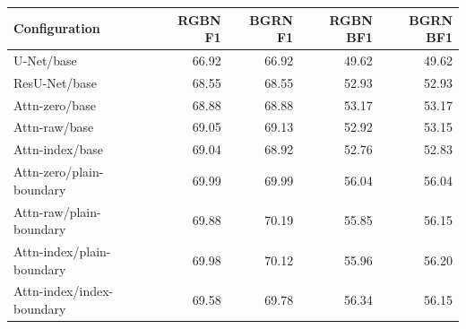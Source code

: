 \footnotesize
\setlength{\tabcolsep}{3.5pt}
\begin{tabular}{@{}lrrrr@{}}
\toprule
Configuration & RGBN F1 & BGRN F1 & RGBN BF1 & BGRN BF1 \\
\midrule
U-Net/base & 66.92 & 66.92 & 49.62 & 49.62 \\
ResU-Net/base & 68.55 & 68.55 & 52.93 & 52.93 \\
Attn-zero/base & 68.88 & 68.88 & 53.17 & 53.17 \\
Attn-raw/base & 69.05 & 69.13 & 52.92 & 53.15 \\
Attn-index/base & 69.04 & 68.92 & 52.76 & 52.83 \\
Attn-zero/plain-boundary & 69.99 & 69.99 & 56.04 & 56.04 \\
Attn-raw/plain-boundary & 69.88 & 70.19 & 55.85 & 56.15 \\
Attn-index/plain-boundary & 69.98 & 70.12 & 55.96 & 56.20 \\
Attn-index/index-boundary & 69.58 & 69.78 & 56.34 & 56.15 \\
\bottomrule
\end{tabular}
